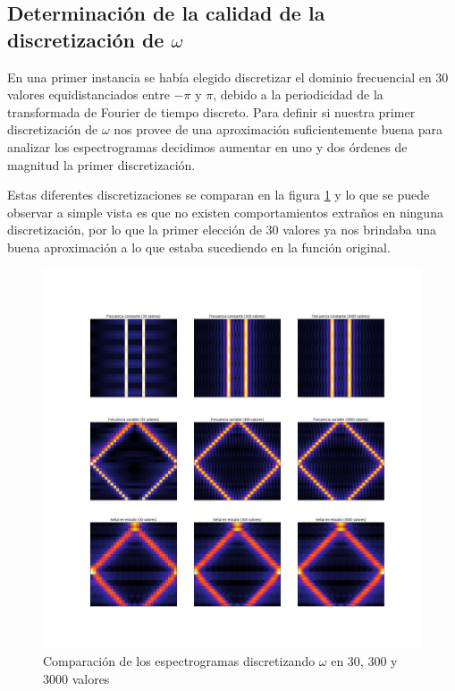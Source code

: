 \documentclass{article}
\begin{document}
\subsection{Determinación de la calidad de la discretización de $\omega$}
En una primer instancia se había elegido discretizar el dominio frecuencial en 30 valores equidistanciados entre $-\pi$ y $\pi$, debido a la periodicidad de la transformada de Fourier de tiempo discreto.
Para definir si nuestra primer discretización de $\omega$ nos provee de una aproximación suficientemente buena para analizar los espectrogramas decidimos aumentar en uno y dos órdenes de magnitud la primer discretización.

Estas diferentes discretizaciones se comparan en la figura \ref{comparacion} y lo que se puede observar a simple vista es que no existen comportamientos extraños en ninguna discretización, por lo que la primer
 elección de 30 valores ya nos brindaba una buena aproximación a lo que estaba sucediendo en la función original.

	         \begin{figure}[h!]
	            \centering
	            \includegraphics[width=\textwidth]{./Imagenes/Espectrogramas/merge.jpg}
	            \caption{Comparación de los espectrogramas  discretizando $\omega$ en 30, 300 y 3000 valores}
	            \label{comparacion}
	        \end{figure}
	    
\end{document}
